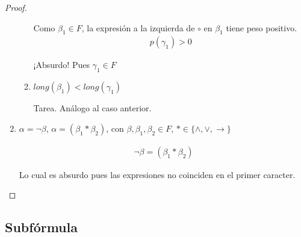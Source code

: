 \begin{proof}
\begin{enumerate}
\begin{enumerate}
                    Como $\beta_1 \in F$, la expresión a la izquierda de 
                    $\circ$ en $\beta_1$ tiene peso positivo.
                    \begin{gather*}
                        p(\gamma_1) > 0
                    \end{gather*}

                    ¡Absurdo!
                    Pues $\gamma_1 \in F$

                \item $long(\beta_1) < long(\gamma_1)$

                    Tarea. Análogo al caso anterior.
            \end{enumerate}

        \item $\alpha = \neg \beta$, $\alpha = (\beta_1 * \beta_2)$, con
            $\beta, \beta_1, \beta_2 \in F$, $*\in \{ \wedge,\vee,\to \}$

            \begin{gather*}
                \neg \beta = (\beta_1 * \beta_2)
            \end{gather*}

            Lo cual es absurdo pues las expresiones no coinciden en el primer
            caracter.
    \end{enumerate}
\end{proof}


\subsection{Subfórmula}


